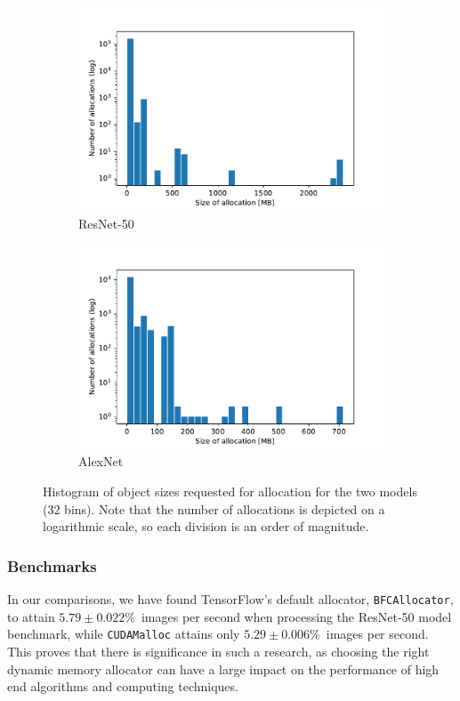 \documentclass[12pt,twoside]{article}
\newcommand{\resnettimebfc}{$5.79\pm0.022\%$}     %
\newcommand{\resnettimecuda}{$5.29\pm0.006\%$}    %
\begin{document}
\begin{figure}[!ht]
  \centering
  \begin{subfigure}[b]{0.49\textwidth}
    \includegraphics[width=\textwidth]{../Quantitative_Python/ResNet-50_hist_MB_ylog.pdf}
    \caption{ResNet-50}
  \end{subfigure}
  \begin{subfigure}[b]{0.49\textwidth}
    \includegraphics[width=\textwidth]{../Quantitative_Python/AlexNet_hist_MB_ylog.pdf}
    \caption{AlexNet}
  \end{subfigure}
  \caption{Histogram of object sizes requested for allocation for the two models ($32$ bins). Note that the number of allocations is depicted on a logarithmic scale, so each division is an order of magnitude.}
  \label{fig:hist}
\end{figure}

\subsubsection*{Benchmarks}
In our comparisons, we have found TensorFlow's default allocator, \texttt{BFCAllocator}, to attain \resnettimebfc\ images per second when processing the ResNet-50 model benchmark, while \texttt{CUDAMalloc} attains only \resnettimecuda\ images per second. This proves that there is significance in such a research, as choosing the right dynamic memory allocator can have a large impact on the performance of high end algorithms and computing techniques.
\end{document}
